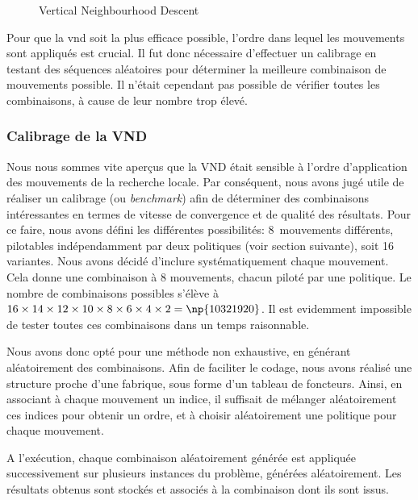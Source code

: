			\begin{figure}[h!]

				\centering
				\begin{tikzpicture}
					
				\end{tikzpicture}
				\caption[UML -- VND]{Vertical Neighbourhood Descent}
				\label{uml:vnd}
			\end{figure}
			
			Pour que la \acrshort{vnd} soit la plus efficace possible, l'ordre dans lequel les mouvements sont appliqués est crucial. Il fut donc nécessaire d'effectuer un calibrage en testant des séquences aléatoires pour déterminer la meilleure combinaison de mouvements possible. Il n'était cependant pas possible de vérifier toutes les combinaisons, à cause de leur nombre trop élevé.
			
			\subsubsection{Calibrage de la VND}
				Nous nous sommes vite aperçus que la VND était sensible à l'ordre d'application des mouvements de la recherche locale. Par conséquent, nous avons jugé utile de réaliser un calibrage (ou \emph{benchmark}) afin de déterminer des combinaisons intéressantes en termes de vitesse de convergence et de qualité des résultats. Pour ce faire, nous avons défini les différentes possibilités: 8~mouvements différents, pilotables indépendamment par deux politiques (voir section suivante), soit 16 variantes. Nous avons décidé d'inclure systématiquement chaque mouvement. Cela donne une combinaison à 8 mouvements, chacun piloté par une politique. Le nombre de combinaisons possibles s'élève à $16 \times 14 \times 12 \times 10 \times 8 \times 6 \times 4 \times 2 = \np{10321920}$. Il est evidemment impossible de tester toutes ces combinaisons dans un temps raisonnable.

				Nous avons donc opté pour une méthode non exhaustive, en générant aléatoirement des combinaisons. Afin de faciliter le codage, nous avons réalisé une structure proche d'une fabrique, sous forme d'un tableau de foncteurs. Ainsi, en associant à chaque mouvement un indice, il suffisait de mélanger aléatoirement ces indices pour obtenir un ordre, et à choisir aléatoirement une politique pour chaque mouvement.

				A l'exécution, chaque combinaison aléatoirement générée est appliquée successivement sur plusieurs instances du problème, générées aléatoirement. Les résultats obtenus sont stockés et associés à la combinaison dont ils sont issus.

